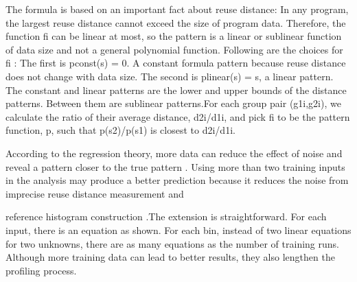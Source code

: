 \documentclass[12pt]{article}
\begin{document}
\vspace{\baselineskip}
\begin{adjustwidth}{0.0in}{0.08in}
{\fontsize{10pt}{12.0pt}\selectfont \textcolor[HTML]{333333}{The formula is based on an important fact about reuse distance: In any program, the largest reuse distance cannot exceed the size of program data. Therefore, the function fi can be linear at most, so the pattern is a linear or sublinear function of data size and not a general polynomial function. Following are the choices for fi : The first is pconst(s) = 0. A constant formula pattern because reuse distance does not change with data size. The second is plinear(s) = s, a linear pattern. The constant and linear patterns are the lower and upper bounds of the distance patterns. Between them are sublinear patterns.For each group pair (g1i,g2i), we calculate the ratio of their average distance, d2i/d1i, and pick fi to be the pattern function, p, such that p(s2)/p(s1) is closest to d2i/d1i.}\par}\par

\end{adjustwidth}


\vspace{\baselineskip}
\begin{adjustwidth}{0.0in}{0.1in}
{\fontsize{10pt}{12.0pt}\selectfont \textcolor[HTML]{333333}{According to the regression theory, more data can reduce the effect of noise and reveal a pattern closer to the true pattern . Using more than two training inputs in the analysis may produce a better prediction because it reduces the noise from imprecise reuse distance measurement and}\par}\par

\end{adjustwidth}


\vspace{\baselineskip}
\begin{adjustwidth}{0.0in}{0.01in}
{\fontsize{11pt}{13.2pt}\selectfont \textcolor[HTML]{333333}{reference histogram construction .The extension is straightforward. For each input, there is an equation as shown. For each bin, instead of two linear equations for two unknowns, there are as many equations as the number of training runs. Although more training data can lead to better results, they also lengthen the profiling process.}\par}\par

\end{adjustwidth}
\end{document}
